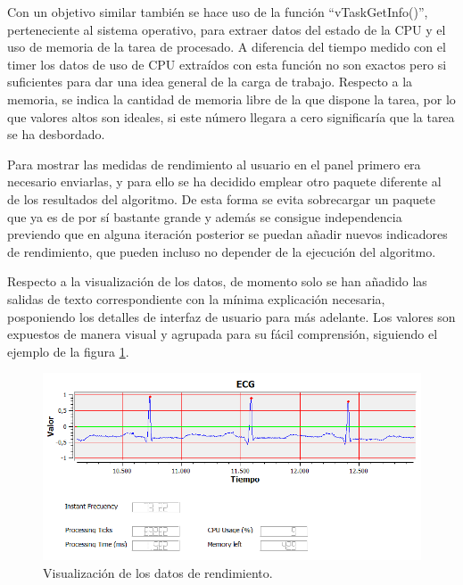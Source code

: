         
        Con un objetivo similar también se hace uso de la función ``vTaskGetInfo()'', perteneciente al sistema operativo, para extraer datos del estado de la CPU y el uso de memoria de la tarea de procesado. A diferencia del tiempo medido con el timer los datos de uso de CPU extraídos con esta función no son exactos pero si suficientes para dar una idea general de la carga de trabajo. Respecto a la memoria, se indica la cantidad de memoria libre de la que dispone la tarea, por lo que valores altos son ideales, si este número llegara a cero significaría que la tarea se ha desbordado. 
        
        Para mostrar las medidas de rendimiento al usuario en el panel primero era necesario enviarlas, y para ello se ha decidido emplear otro paquete diferente al de los resultados del algoritmo. De esta forma se evita sobrecargar un paquete que ya es de por sí bastante grande y además se consigue independencia previendo que en alguna iteración posterior se puedan añadir nuevos indicadores de rendimiento, que pueden incluso no depender de la ejecución del algoritmo.
        
        Respecto a la visualización de los datos, de momento solo se han añadido las salidas de texto correspondiente con la mínima explicación necesaria, posponiendo los detalles de interfaz de usuario para más adelante. Los valores son expuestos de manera visual y agrupada para su fácil comprensión, siguiendo el ejemplo de la figura \ref{fig:performance}.
        
        \begin{figure}[H]
                \centering
                        \includegraphics[width = 0.9 \linewidth]{figuras/Performance.PNG}
                \caption{Visualización de los datos de rendimiento.}
                \label{fig:performance}
        \end{figure}
        
